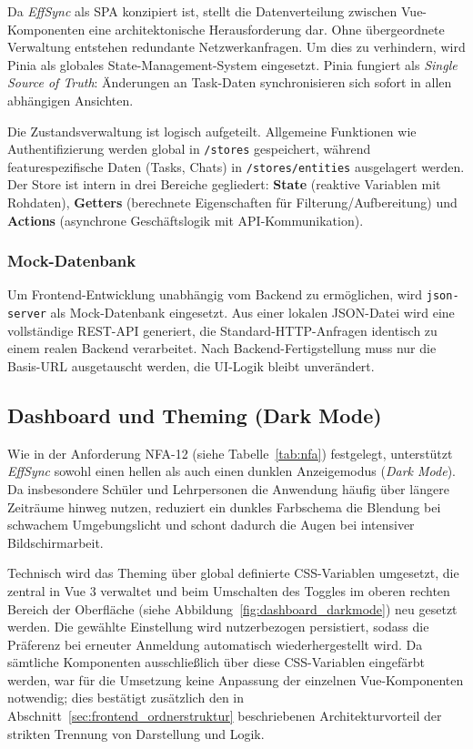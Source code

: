 Da \textit{EffSync} als \gls{SPA} konzipiert ist, stellt die Datenverteilung zwischen Vue-Komponenten eine architektonische Herausforderung dar. Ohne übergeordnete Verwaltung entstehen redundante Netzwerkanfragen. Um dies zu verhindern, wird Pinia als globales State-Management-System eingesetzt\cite{vuejs_state_managment}. Pinia fungiert als \textit{Single Source of Truth}: Änderungen an Task-Daten synchronisieren sich sofort in allen abhängigen Ansichten.

Die Zustandsverwaltung ist logisch aufgeteilt. Allgemeine Funktionen wie Authentifizierung werden global in \texttt{/stores} gespeichert, während featurespezifische Daten (Tasks, Chats) in \texttt{/stores/entities} ausgelagert werden. Der Store ist intern in drei Bereiche gegliedert: \textbf{State} (reaktive Variablen mit Rohdaten), \textbf{Getters} (berechnete Eigenschaften für Filterung/Aufbereitung) und \textbf{Actions} (asynchrone Geschäftslogik mit API-Kommunikation).

\subsubsection{Mock-Datenbank}
Um Frontend-Entwicklung unabhängig vom Backend zu ermöglichen, wird \texttt{json-server}\cite{typicode_json_server} als Mock-Datenbank eingesetzt\cite{newman2021building}. Aus einer lokalen JSON-Datei wird eine vollständige REST-API generiert, die Standard-HTTP-Anfragen identisch zu einem realen Backend verarbeitet. Nach Backend-Fertigstellung muss nur die Basis-URL ausgetauscht werden, die UI-Logik bleibt unverändert.

\subsection{Dashboard und Theming (Dark Mode)}
\label{sec:dashboard_darkmode}

Wie in der Anforderung NFA-12 (siehe Tabelle~\ref{tab:nfa}) festgelegt, unterstützt \textit{EffSync} sowohl einen hellen als auch einen dunklen Anzeigemodus (\textit{Dark Mode}). Da insbesondere Schüler und Lehrpersonen die Anwendung häufig über längere Zeiträume hinweg nutzen, reduziert ein dunkles Farbschema die Blendung bei schwachem Umgebungslicht und schont dadurch die Augen bei intensiver Bildschirmarbeit.

Technisch wird das Theming über global definierte CSS-Variablen umgesetzt, die zentral in Vue 3 verwaltet und beim Umschalten des Toggles im oberen rechten Bereich der Oberfläche (siehe Abbildung~\ref{fig:dashboard_darkmode}) neu gesetzt werden. Die gewählte Einstellung wird nutzerbezogen persistiert, sodass die Präferenz bei erneuter Anmeldung automatisch wiederhergestellt wird. Da sämtliche Komponenten ausschließlich über diese CSS-Variablen eingefärbt werden, war für die Umsetzung keine Anpassung der einzelnen Vue-Komponenten notwendig; dies bestätigt zusätzlich den in Abschnitt~\ref{sec:frontend_ordnerstruktur} beschriebenen Architekturvorteil der strikten Trennung von Darstellung und Logik.

